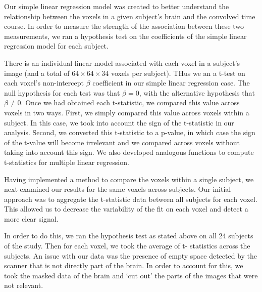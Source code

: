 \par \indent Our simple linear regression model was created to better understand the relationship between 
the voxels in a given subject's brain and the convolved time course. In order 
to measure the strength of the association between these two measurements, we 
ran a hypothesis test on the coefficients of the simple linear regression 
model for each subject.

\par There is an individual linear model associated with each voxel in a 
subject’s image (and a total of $64 \times 64 \times 34$ voxels per subject). 
THus we an a t-test on each voxel's non-intercept $\beta$ coefficient in our 
simple linear regression case. The null hypothesis for each test was that $
\beta = 0$, with the alternative hypothesis that $\beta \neq 0$. Once we had 
obtained each t-statistic, we compared this value across voxels in two ways. 
First, we simply compared this value across voxels within a subject. In this 
case, we took into account the sign of the t-statistic in our analysis. 
Second, we converted this t-statistic to a p-value, in which case the sign of 
the t-value will become irrelevant and we compared across voxels without 
taking into account this sign.  We also developed analogous functions to 
compute t-statistics for multiple linear regression. 

\par Having implemented a  method to compare the voxels within a single 
subject, we next examined our results for the same voxels across subjects. 
Our initial approach was to aggregate the t-statistic data between all 
subjects for each voxel. This allowed us to decrease the variability of the 
fit on each voxel and detect a more clear signal. 

\par In order to do this, we ran the hypothesis test as stated above on all 
24 subjects of the study. Then for each voxel, we took the average of t-
statistics across the subjects. An issue with our data was the presence of 
empty space detected by the scanner that is not directly part of the brain. 
In order to account for this, we took the masked data of the brain and ‘cut 
out’ the parts of the images that were not relevant. 

